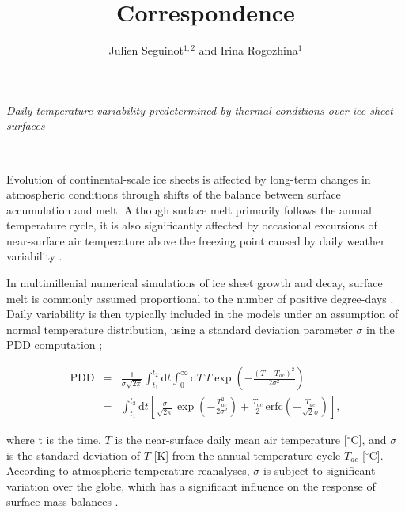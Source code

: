 \documentclass[review]{igs}
\begin{document}
\title[Correspondence]{Correspondence}
\author[Seguinot and Rogozhina]{Julien Seguinot$^{1,2}$ and Irina Rogozhina$^1$}

\maketitle


\emph{Daily temperature variability predetermined by thermal conditions over ice sheet surfaces}

~

Evolution of continental-scale ice sheets is affected by long-term changes in atmospheric conditions through shifts of the balance between surface accumulation and melt. Although surface melt primarily follows the annual temperature cycle, it is also significantly affected by occasional excursions of near-surface air temperature above the freezing point caused by daily weather variability \citep{arnold-mackay-1964}.

In multimillenial numerical simulations of ice sheet growth and decay, surface melt is commonly assumed proportional to the number of positive degree-days \citep[PDD;][]{hock-2003}. Daily variability is then typically included in the models under an assumption of normal temperature distribution, using a standard deviation parameter $\sigma$ in the PDD computation \citep{braithwaite-1984,reeh-1991,calov-greve-2005};

\begin{eqnarray} \label{eq:pdd}
    \mathrm{PDD} &=& \frac{1}{\sigma\sqrt{2\pi}}
        \int_{t_1}^{t_2} \mathrm{d}t
        \int_{0}^{\infty} \mathrm{d}T \,
        T \exp\left({-\frac{(T-T_{ac})^2}{2\sigma^2}}\right)\\
    &=& \int_{t_1}^{t_2} \mathrm{d}t
        \left[\frac{\sigma}{\sqrt{2\pi}} \exp\left({-\frac{T_{ac}^2}{2\sigma^2}}\right)
        + \frac{T_{ac}}{2} \, \mathrm{erfc} \left(-\frac{T_{ac}}{\sqrt{2}\sigma}\right)\right],
\end{eqnarray}

where t is the time, $T$ is the near-surface daily mean air temperature [$^\circ$C], and $\sigma$ is the standard deviation of $T$ [K] from the annual temperature cycle $T_{ac}$ [$^\circ$C]. According to atmospheric temperature reanalyses, $\sigma$ is subject to significant variation over the globe, which has a significant influence on the response of surface mass balances \citep{seguinot-2013}.
\end{document}
